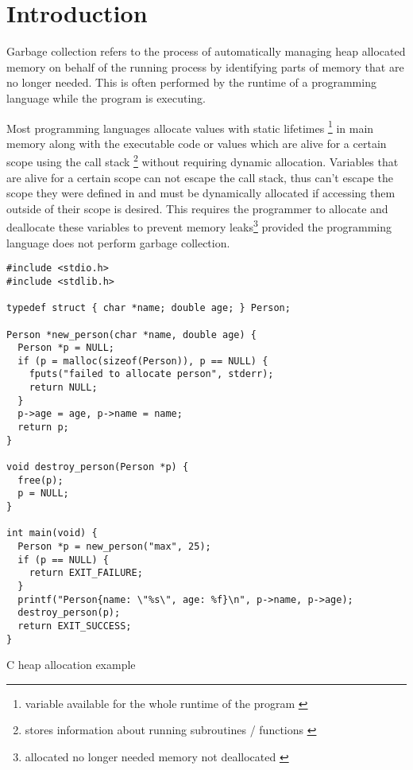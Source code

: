 \section{Introduction}

Garbage collection refers to the process of automatically managing
heap allocated memory on behalf of the running process by
identifying parts of memory that are no longer needed. \cite[Introduction]{go_gcguide_2022}
This is often performed by the runtime of a programming language while the
program is executing. \cite[Introduction]{go_spec_2023}

Most programming languages allocate values with static lifetimes
\footnote{variable available for the whole runtime of the
program \cite[Abstract]{static-dynamic-scope_tanter_2009}} in main memory along
with the executable code or values which are alive for a certain scope using
the call stack \footnote{stores information about running
subroutines / functions \cite[2.2 Call Stacks]{call-stack_mcmaster-memon_2006}}
without requiring dynamic allocation. Variables that are alive for a certain
scope can not escape the call stack, thus can't escape the scope they were
defined in and must be dynamically allocated if accessing them outside of their
scope is desired. This requires the programmer to allocate and deallocate these
variables to prevent memory leaks\footnote{allocated no longer needed
memory not deallocated \cite[1.2.1 A Practical Object Ownership
Model]{practical_heine-lam_2003}} provided the programming language does not
perform garbage collection. 

\begin{listing}[H] \begin{verbatim} 
#include <stdio.h>
#include <stdlib.h>

typedef struct { char *name; double age; } Person;

Person *new_person(char *name, double age) {
  Person *p = NULL;
  if (p = malloc(sizeof(Person)), p == NULL) {
    fputs("failed to allocate person", stderr);
    return NULL;
  }
  p->age = age, p->name = name;
  return p;
}

void destroy_person(Person *p) {
  free(p);
  p = NULL;
}

int main(void) {
  Person *p = new_person("max", 25);
  if (p == NULL) {
    return EXIT_FAILURE;
  }
  printf("Person{name: \"%s\", age: %f}\n", p->name, p->age);
  destroy_person(p);
  return EXIT_SUCCESS;
}
    \end{verbatim}
    \caption{C heap allocation example}
    \label{code:c_heap_alloc_example}
\end{listing}

